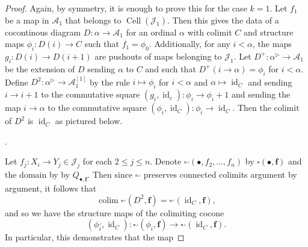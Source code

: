 \documentclass[leqno]{article}
\numberwithin{equation}{subsection}
\theoremstyle{plain}   %
\theoremstyle{remark}
\theoremstyle{plain}
\DeclareMathOperator{\id}{id}
\DeclareMathOperator{\colim}{colim}
\begin{document}
\begin{proof}
	Again, by symmetry, it is enough to prove this for the case \(k=1\). 
	Let \(f_1\) be a map in \(\mathcal{A}_1\) that belongs to \(\operatorname{Cell}(\mathscr{J}_1)\).  Then this gives the data of a cocontinous diagram \(D:\alpha \to \mathcal{A}_1\) for an ordinal \(\alpha\) with colimit \(C\) and structure maps \(\phi_i: D(i)\to C\) such that \(f_1=\phi_0\).  Additionally, for any \(i <\alpha\), the maps \(g_i:D(i)\to D(i+1)\) are pushouts of maps belonging to \(\mathscr{J}_1\).
	Let \(D^+:\alpha^\triangleright \to \mathcal{A}_1\) be the extension of \(D\) sending \(\alpha\) to \(C\) and such that \(D^+(i\to \alpha)=\phi_i\) for \(i<\alpha\).  Define \(D^2: \alpha^\triangleright \to \mathcal{A}_1^{[1]}\) by the rule \(i\mapsto \phi_i\) for \(i<\alpha\) and \(\alpha\mapsto \id_C\) and sending \(i\to i+1\) to the commutative square \((g_i,\id_c):\phi_i\to \phi_i+1\) and sending the map \(i\to \alpha\) to the commutative square \((\phi_i,\id_C):\phi_i\to \id_C\).  Then the colimit of \(D^2\) is \(\id_C\) as pictured below.
	\begin{center}
		.
	\end{center}
	Let \(f_j:X_i\to Y_j \in \mathscr{J}_j\) for each \(2\leq j\leq n\). Denote \(\square^\lrcorner(\bullet,f_2,\dots, f_n)\) by \(\square(\bullet,\mathbf{f})\) and the domain by by \(Q_{\bullet,\mathbf{f}}\).  Then since \(\square^\lrcorner\) preserves connected colimits argument by argument, it follows that 
	\[
		\colim\square^\lrcorner(D^2,\mathbf{f})=\square^\lrcorner(\id_C,\mathbf{f}),
	\]
	and so we have the structure maps of the colimiting cocone
	\[
		(\phi_i^\lrcorner,\id_C): \square^\lrcorner(\phi_i,\mathbf{f}) \to \square^\lrcorner(\id_C,\mathbf{f}).
	\]
	In particular, this demonstrates that the map

\end{proof}
\end{document}
